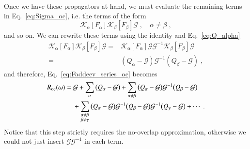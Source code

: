 \documentclass[aip,jcp,reprint,noshowkeys,superscriptaddress]{revtex4-1}
\newcommand{\cK}{\mathcal{K}}
\begin{document}
Once we have these propagators at hand, we must evaluate the remaining 
terms in Eq.~\eqref{eq:Sigma_oc}, i.e. the terms of the form 
\begin{equation}
	\cK_{\alpha}[F_\alpha]
	\cK_{\beta}[F_\beta] \mathcal G \;, \quad \alpha \neq \beta \;, 
\end{equation}
and so on. We can rewrite these terms using the identity and
Eq.~\eqref{eq:Q_alpha}
\begin{equation}
	\begin{aligned}
	\cK_{\alpha}[F_\alpha]
	\cK_{\beta}[F_\beta] \mathcal G = &  
	\cK_{\alpha}[F_\alpha]\mathcal G \mathcal G^{-1}
	\cK_{\beta}[F_\beta] \mathcal G \\
	= & 
	\left(Q_\alpha - \mathcal G\right)	
	\mathcal G^{-1}
	\left(Q_\beta - \mathcal G\right) \;,
	\end{aligned}	
\end{equation} 
and therefore, Eq.~\eqref{eq:Faddeev_series_oc} becomes 
\begin{equation}
\begin{aligned}
R_{\rm oc}(\omega)
={}&
\mathcal G+\sum_{\alpha}\big(Q_\alpha-\mathcal G\big)
+\sum_{\alpha\neq\beta}\big(Q_\alpha-\mathcal G\big)\mathcal G^{-1}\big(Q_\beta-\mathcal G\big)
\\
&+\sum_{\substack{\alpha\neq\beta\\\beta\neq\gamma}}
\big(Q_\alpha-\mathcal G\big)\mathcal G^{-1}\big(Q_\beta-\mathcal G\big)
\mathcal G^{-1}\big(Q_\gamma-\mathcal G\big)+\cdots \;.
\end{aligned}
\label{eq:R_oc_omega}
\end{equation}
Notice that this step strictly requires the no-overlap 
approximation, otherwise we could not just insert 
$\mathcal G \mathcal G^{-1}$ in each term.
\end{document}
